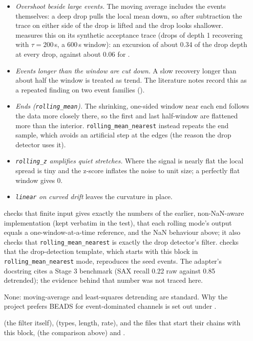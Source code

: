 \begin{itemize}
\item \emph{Overshoot beside large events.} The moving average includes the events themselves:
  a deep drop pulls the local mean down, so after subtraction the trace on either side of the
  drop is lifted and the drop looks shallower.  measures this on its
  synthetic acceptance trace (drops of depth 1 recovering with $\tau = 200$\,s, a 600\,s
  window): an excursion of about 0.34 of the drop depth at every drop, against about 0.06 for
  .
\item \emph{Events longer than the window are cut down.} A slow recovery longer than about
  half the window is treated as trend. The literature notes record this as a repeated finding
  on two event families ().
\item \emph{Ends (\texttt{rolling\_mean}).} The shrinking, one-sided window near each end
  follows the data more closely there, so the first and last half-window are flattened more
  than the interior. \texttt{rolling\_mean\_nearest} instead repeats the end sample, which
  avoids an artificial step at the edges (the reason the drop detector uses it).
\item \emph{\texttt{rolling\_z} amplifies quiet stretches.} Where the signal is nearly flat the
  local spread is tiny and the z-score inflates the noise to unit size; a perfectly flat window
  gives 0.
\item \emph{\texttt{linear} on curved drift} leaves the curvature in place.
\end{itemize}

 checks that finite input gives exactly the numbers of the
earlier, non-NaN-aware implementation (kept verbatim in the test), that each rolling mode's
output equals a one-window-at-a-time reference, and the NaN behaviour above; it also checks
that \texttt{rolling\_mean\_nearest} is exactly the drop detector's filter.
 checks that the drop-detection template, which
starts with this block in \texttt{rolling\_mean\_nearest} mode, reproduces the seed events. The
adapter's docstring cites a Stage 3 benchmark (SAX recall 0.22 raw against 0.85 detrended);
the evidence behind that number was not traced here.

None: moving-average and least-squares detrending are standard. Why the project prefers BEADS
for event-dominated channels is set out under .

 (the filter itself), 
(types, length, rate),  and the
 files that start their chains with this block,
 (the comparison above) and .

